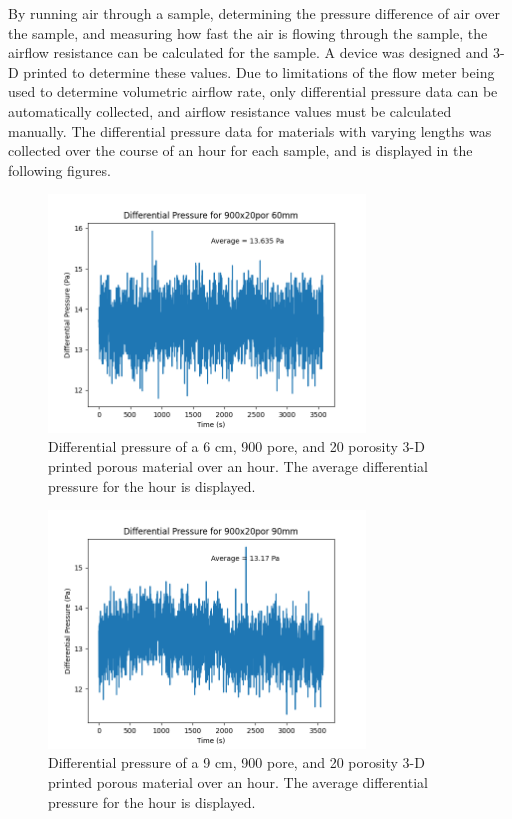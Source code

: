 	By running air through a sample, determining the pressure difference of air over the 
sample, and measuring how fast the air is flowing through the sample, the airflow resistance 
can be calculated for the sample. A device was designed and 3-D printed to determine these 
values. Due to limitations of the flow meter being used to determine volumetric airflow rate, 
only differential pressure data can be automatically collected, and airflow resistance values 
must be calculated manually. The differential pressure data for materials with varying 
lengths was collected over the course of an hour for each sample, and is displayed in the 
following figures.
\begin{figure}[H]
  \begin{center}
    \includegraphics[width=0.75\textwidth]{900_20por_50-60_1hr_(.30-.45).png}
  \end{center}
  \caption{Differential pressure of a 6 cm, 900 pore, and 20 porosity 3-D printed porous 
material over an hour. The average differential pressure for the hour is displayed.}
  \label{fig:6cm_dp_graph}
\end{figure}

\begin{figure}[H]
  \begin{center}
    \includegraphics[width=0.75\textwidth]{900_20por_80-90(reprint)_1hr_(.25-.42speed).png}
  \end{center}
  \caption{Differential pressure of a 9 cm, 900 pore, and 20 porosity 3-D printed porous 
material over an hour. The average differential pressure for the hour is displayed.}
  \label{fig:9cm_dp_graph}
\end{figure}

